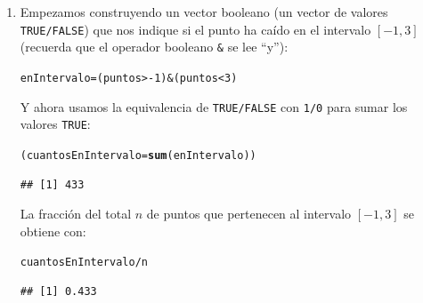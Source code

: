 \documentclass[10pt,a4paper]{article}\usepackage[]{graphicx}\usepackage[]{color}
\makeatletter
\newcommand{\hlnum}[1]{\textcolor[rgb]{0.686,0.059,0.569}{#1}}%
\newcommand{\hlopt}[1]{\textcolor[rgb]{0,0,0}{#1}}%
\newcommand{\hlstd}[1]{\textcolor[rgb]{0.345,0.345,0.345}{#1}}%
\newcommand{\hlkwb}[1]{\textcolor[rgb]{0.69,0.353,0.396}{#1}}%
\newcommand{\hlkwd}[1]{\textcolor[rgb]{0.737,0.353,0.396}{\textbf{#1}}}%
\newenvironment{kframe}{%
 \def\at@end@of@kframe{}%
 \ifinner\ifhmode%
  \def\at@end@of@kframe{\end{minipage}}%
  \begin{minipage}{\columnwidth}%
 \fi\fi%
 \def\FrameCommand##1{\hskip\@totalleftmargin \hskip-\fboxsep
 \colorbox{shadecolor}{##1}\hskip-\fboxsep
     \hskip-\linewidth \hskip-\@totalleftmargin \hskip\columnwidth}%
 \MakeFramed {\advance\hsize-\width
   \@totalleftmargin\z@ \linewidth\hsize
   \@setminipage}}%
 {\par\unskip\endMakeFramed%
 \at@end@of@kframe}
\newenvironment{knitrout}{}{} %
\makeatother
\begin{document}
\begin{enumerate}
  \item Empezamos construyendo un vector booleano (un vector de valores {\tt TRUE/FALSE}) que nos indique si el punto ha caído en el intervalo $[-1, 3]$ (recuerda que el operador booleano \verb#&# se lee ``y''):
\begin{knitrout}
\color{fgcolor}\begin{kframe}
\begin{alltt}
\hlstd{enIntervalo} \hlkwb{=} \hlstd{(puntos} \hlopt{> -}\hlnum{1} \hlstd{)} \hlopt{&} \hlstd{(puntos} \hlopt{<} \hlnum{3}\hlstd{)}
\end{alltt}
\end{kframe}
\end{knitrout}
  Y ahora usamos la equivalencia de {\tt TRUE/FALSE} con {\tt 1/0} para sumar los valores {\tt TRUE}:
\begin{knitrout}
\color{fgcolor}\begin{kframe}
\begin{alltt}
\hlstd{(cuantosEnIntervalo} \hlkwb{=} \hlkwd{sum}\hlstd{(enIntervalo))}
\end{alltt}
\begin{verbatim}
## [1] 433
\end{verbatim}
\end{kframe}
\end{knitrout}
  La fracción del total $n$ de puntos que pertenecen al intervalo $[-1, 3]$ se obtiene con:
\begin{knitrout}
\color{fgcolor}\begin{kframe}
\begin{alltt}
\hlstd{cuantosEnIntervalo} \hlopt{/} \hlstd{n}
\end{alltt}
\begin{verbatim}
## [1] 0.433
\end{verbatim}
\end{kframe}
\end{knitrout}


\end{enumerate}
\end{document}
